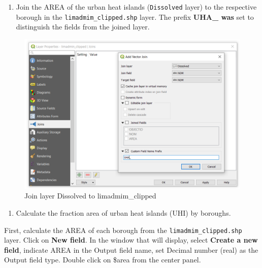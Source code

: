 \documentclass[]{book}
\providecommand{\tightlist}{%
  \setlength{\itemsep}{0pt}\setlength{\parskip}{0pt}}
\theoremstyle{definition}
\theoremstyle{definition}
\theoremstyle{definition}
\theoremstyle{remark}
\begin{document}
\begin{enumerate}
\def\labelenumi{\arabic{enumi}.}
\setcounter{enumi}{7}
\tightlist
\item
  Join the AREA of the urban heat islands (\texttt{Dissolved} layer) to
  the respective borough in the \texttt{limadmim\_clipped.shp} layer.
  The prefix \textbf{UHA\_ was} set to distinguish the fields from the
  joined layer.
\end{enumerate}

\begin{figure}

{\centering \includegraphics[width=14.26in]{figures/Join_UHA} 

}

\caption{Join layer Dissolved to limadmim_clipped}\label{fig:unnamed-chunk-35}
\end{figure}

\begin{enumerate}
\def\labelenumi{\arabic{enumi}.}
\setcounter{enumi}{8}
\tightlist
\item
  Calculate the fraction area of urban heat islands (UHI) by boroughs.
\end{enumerate}

First, calculate the AREA of each borough from the
\texttt{limadmim\_clipped.shp} layer. Click on \textbf{New field}. In
the window that will display, select \textbf{Create a new field},
indicate AREA in the Output field name, set Decimal number (real) as the
Output field type. Double click on \$area from the center panel.
\end{document}
